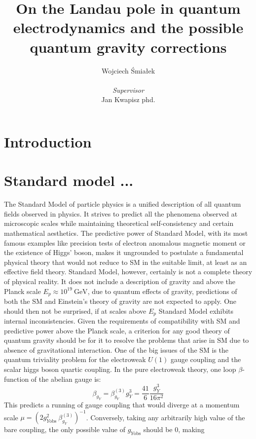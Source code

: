 \documentclass[11pt, a4paper]{article}
\title{\vspace{-2cm}On the Landau pole in quantum electrodynamics and the possible quantum gravity corrections}
\author{{Wojciech Śmiałek}\\
\\
{\textit{Supervisor}} \\
{Jan Kwapisz phd.}}
\date{}
\begin{document}
\maketitle

\section*{Introduction}

\section{Standard model ...}
The Standard Model of particle physics is a unified description of all quantum fields observed in physics. 
It strives to predict all the phenomena observed at microscopic scales while maintaining theoretical
self-consistency and certain mathematical aesthetics. The predictive power of Standard Model, with its most
famous examples like precision tests of electron anomalous magnetic moment or the existence of Higgs' boson,
makes it ungrounded to postulate a fundamental physical theory that would not reduce to SM in the suitable limit, at least
as an effective field theory.
Standard Model, however, certainly is not a complete theory of physical reality. It does not include a description
of gravity and above the Planck scale $E_p \approx 10^{19} \ \text{GeV}$, due to quantum effects of gravity,
predictions of both the SM and Einstein's theory of gravity are not expected to apply.
One should then not be surprised, if at scales above $E_p$ Standard Model exhibits internal inconsistencies.
Given the requirements of compatibility with SM and predictive power above the Planck scale, a criterion
for any good theory of quantum gravity should be for it to resolve the problems that arise in SM due to absence of
gravitational interaction.
One of the big issues of the SM is the quantum triviality problem for the electroweak $U(1)$ gauge coupling and
the scalar higgs boson quartic coupling.
In the pure electroweak theory, one loop $\beta$-function of the abelian gauge \cite{betaf scalar} \cite{betaf chiral lagrangian} is:%
\begin{equation}
    \beta_{g_Y} = \beta_{g_Y}^{(3)} g_Y^3 = \frac{41}{6} \frac{g_Y^3}{16 \pi^2}
\end{equation}
This predicts a running of gauge coupling that would diverge at a momentum scale $\mu = \left(2 g_{Y\text{obs}}^2 \ \beta_{g_Y}^{(3)} \right)^{-1} $.
Conversely, taking any arbitrarily high value of the bare coupling, the only possible value of $g_{Y\text{obs}}$ should be 0, making
\end{document}

